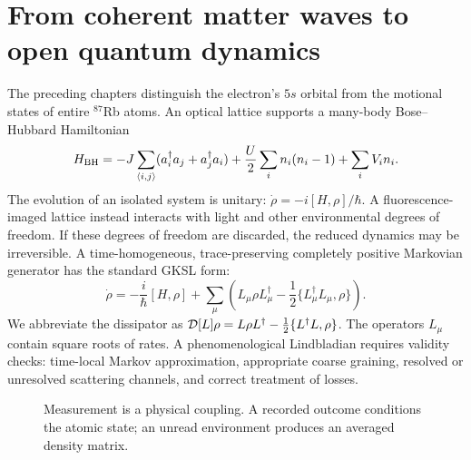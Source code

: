 \documentclass[11pt,a4paper]{article}
\begin{document}
\section{From coherent matter waves to open quantum dynamics}
The preceding chapters distinguish the electron's $5s$ orbital from the motional states of entire $^{87}$Rb atoms. An optical lattice supports a many-body Bose--Hubbard Hamiltonian
\begin{equation}
H_{\rm BH}=-J\sum_{\langle i,j\rangle}(a_i^\dagger a_j+a_j^\dagger a_i)+\frac U2\sum_i n_i(n_i-1)+\sum_i V_i n_i.
\end{equation}
The evolution of an isolated system is unitary: $\dot\rho=-i[H,\rho]/\hbar$. A fluorescence-imaged lattice instead interacts with light and other environmental degrees of freedom. If these degrees of freedom are discarded, the reduced dynamics may be irreversible. A time-homogeneous, trace-preserving completely positive Markovian generator has the standard GKSL form:
\begin{equation}\label{eq:gksl}
\boxed{\dot\rho=-\frac{i}{\hbar}[H,\rho]+\sum_\mu\left(L_\mu\rho L_\mu^\dagger-\frac12\{L_\mu^\dagger L_\mu,\rho\}\right).}
\end{equation}
We abbreviate the dissipator as $\mathcal D[L]\rho=L\rho L^\dagger-\tfrac12\{L^\dagger L,\rho\}$. The operators $L_\mu$ contain square roots of rates. A phenomenological Lindbladian requires validity checks: time-local Markov approximation, appropriate coarse graining, resolved or unresolved scattering channels, and correct treatment of losses.
\begin{figure}[ht]\centering
{}
\caption{Measurement is a physical coupling. A recorded outcome conditions the atomic state; an unread environment produces an averaged density matrix.}
\end{figure}
\end{document}
